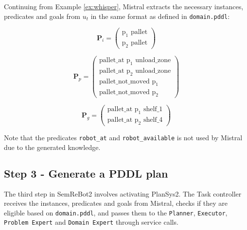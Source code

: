 \begin{example}\label{ex:mistral}
    Continuing from Example \ref{ex:whisper}, Mistral extracts the necessary instances, predicates and goals from $u_{t}$ in the same format as defined in \verb|domain.pddl|:

    \begin{equation}
        \mathbf{P}_{i}=
        \begin{pmatrix}
            \text{p}_{1} \text{ pallet} \\
            \text{p}_{2} \text{ pallet}
        \end{pmatrix}
    \end{equation}
    
    \begin{equation}
        \mathbf{P}_{p}=
        \begin{pmatrix}
            \text{pallet\_at p}_{1} \text{ unload\_zone} \\    
            \text{pallet\_at p}_{2} \text{ unload\_zone} \\
            \text{pallet\_not\_moved p}_{1} \\
            \text{pallet\_not\_moved p}_{2}
        \end{pmatrix}
    \end{equation}

    \begin{equation}
        \mathbf{P}_{g} =
        \begin{pmatrix}
            \text{pallet\_at p}_{1} \text{ shelf\_1} \\
            \text{pallet\_at p}_{2} \text{ shelf\_4}
        \end{pmatrix}
    \end{equation}

Note that the predicates \verb|robot_at| and \verb|robot_available| is not used by Mistral due to the generated knowledge.
\end{example}

\subsection{Step 3 - Generate a PDDL plan}
The third step in SemReBot2 involves activating PlanSys2. The Task controller receives the instances, predicates and goals from Mistral, checks if they are eligible based on \verb|domain.pddl|, and passes them to the \verb|Planner|, \verb|Executor|, \verb|Problem Expert| and \verb|Domain Expert| through service calls.

